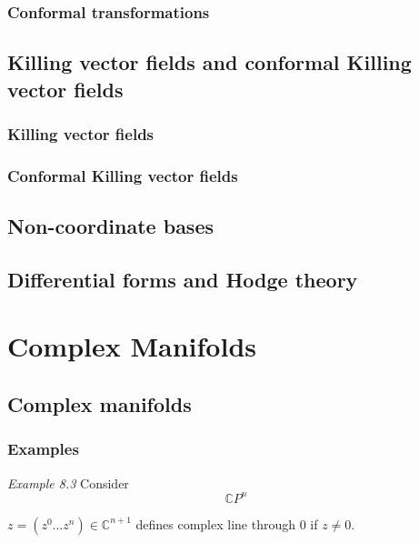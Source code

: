 \documentclass{book}
\begin{document}
\subsection{ Conformal transformations }

\section{ Killing vector fields and conformal Killing vector fields }

\subsection{ Killing vector fields }

\subsection{ Conformal Killing vector fields }

\section{ Non-coordinate bases }

\section{ Differential forms and Hodge theory }




\chapter{Complex Manifolds}

\section{Complex manifolds }

\subsection{}

\subsection{Examples}

\emph{Example 8.3}
Consider 
\[
\mathbb{C}P^n
\]

$z=(z^0 \dots z^n) \in \mathbb{C}^{n+1}$ defines complex line through $0$ if $z\neq 0$.
\end{document}
